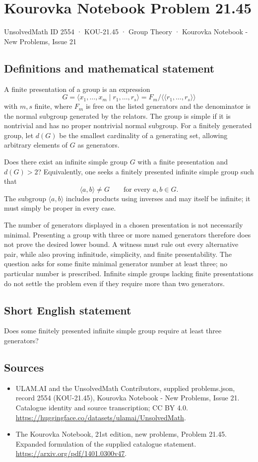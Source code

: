 \documentclass[11pt,a4paper]{article}
\begin{document}
\section*{Kourovka Notebook Problem 21.45}\label{2554}
{\small UnsolvedMath ID 2554 · KOU-21.45 · Group Theory · Kourovka Notebook - New Problems, Issue 21}
\subsection{Definitions and mathematical statement}
A finite presentation of a group is an expression
\[
 G=\langle x_1,\ldots,x_m\mid r_1,\ldots,r_s\rangle
   =F_m/\langle\!\langle r_1,\ldots,r_s\rangle\!\rangle
\]
with $m,s$ finite, where $F_m$ is free on the listed generators and
the denominator is the normal subgroup generated by the relators.
The group is simple if it is nontrivial and has no proper nontrivial
normal subgroup.
For a finitely generated group, let $d(G)$ be the smallest cardinality
of a generating set, allowing arbitrary elements of $G$ as generators.

Does there exist an infinite simple group $G$ with a finite presentation
and $d(G)>2$? Equivalently, one seeks a finitely presented infinite simple
group such that
\[
 \langle a,b\rangle\ne G\qquad\text{for every }a,b\in G.
\]
The subgroup $\langle a,b\rangle$ includes products using inverses and
may itself be infinite; it must simply be proper in every case.

The number of generators displayed in a chosen presentation is not
necessarily minimal. Presenting a group with three or more named
generators therefore does not prove the desired lower bound. A witness
must rule out every alternative pair, while also proving infinitude,
simplicity, and finite presentability. The question asks for some finite
minimal generator number at least three; no particular number is prescribed.
Infinite simple groups lacking finite presentations do not settle the
problem even if they require more than two generators.
\subsection{Short English statement}
Does some finitely presented infinite simple group require at least three generators?
\subsection{Sources}
\begin{itemize}
\item[S1] ULAM.AI and the UnsolvedMath Contributors, supplied problems.json, record 2554 (KOU-21.45), Kourovka Notebook - New Problems, Issue 21. Catalogue identity and source transcription; CC BY 4.0.
\url{https://huggingface.co/datasets/ulamai/UnsolvedMath}.
\item[S2] The Kourovka Notebook, 21st edition, new problems, Problem 21.45. Expanded formulation of the supplied catalogue statement.
\url{https://arxiv.org/pdf/1401.0300v47}.
\end{itemize}
\end{document}
